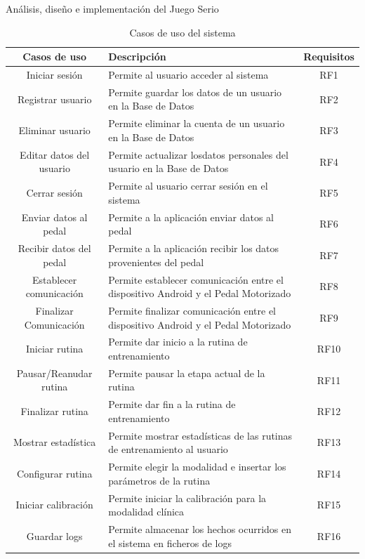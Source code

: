 \begin{thesischapter}{2} {Análisis, diseño e implementación del Juego Serio}
    \begin{table}[h]
        \centering
        \begin{tabularx}{\textwidth}{|c|X|c|}
            \hline
            \textbf{Casos de uso} & \textbf{Descripción} & \textbf{Requisitos}\\\hline
            Iniciar sesión & Permite al usuario acceder al sistema & RF1\\\hline
            Registrar usuario & Permite guardar los datos de un usuario en la Base de Datos & RF2\\\hline
            Eliminar usuario & Permite eliminar la cuenta de un usuario en la Base de Datos & RF3\\\hline
            Editar datos del usuario & Permite actualizar losdatos personales del usuario en la Base de Datos & RF4\\\hline
            Cerrar sesión & Permite al usuario cerrar sesión en el sistema & RF5\\\hline
            Enviar datos al pedal & Permite a la aplicación enviar datos al pedal & RF6 \\\hline
            Recibir datos del pedal & Permite a la aplicación recibir los datos provenientes del pedal & RF7\\\hline
            Establecer comunicación & Permite establecer comunicación entre el dispositivo Android y el Pedal Motorizado & RF8\\\hline
            Finalizar Comunicación & Permite finalizar comunicación entre el dispositivo Android y el Pedal Motorizado & RF9\\\hline
            Iniciar rutina & Permite dar inicio a la rutina de entrenamiento & RF10\\\hline
            Pausar/Reanudar rutina & Permite pausar la etapa actual de la rutina & RF11\\\hline
            Finalizar rutina & Permite dar fin a la rutina de entrenamiento & RF12\\\hline
            Mostrar estadística & Permite mostrar estadísticas de las rutinas de entrenamiento  al usuario& RF13\\\hline
            Configurar rutina & Permite elegir la modalidad e insertar los parámetros de la rutina  & RF14\\\hline
            Iniciar calibración & Permite iniciar la calibración para la modalidad clínica  & RF15\\\hline
            Guardar logs & Permite almacenar los hechos ocurridos en el sistema en ficheros de logs & RF16\\\hline
        \end{tabularx}
        \label{tab: rf}
        \caption{Casos de uso del sistema}
    \end{table}
    

\end{thesischapter}
